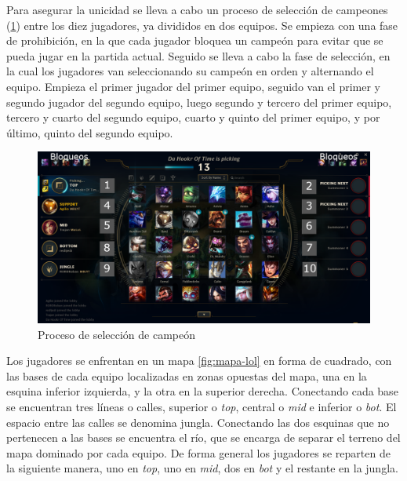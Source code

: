 Para asegurar la unicidad se lleva a cabo un proceso de selección de campeones (\ref{fig:early-pick}) entre los diez jugadores, ya divididos en dos equipos. Se empieza con una fase de prohibición, en la que cada jugador bloquea un campeón para evitar que se pueda jugar en la partida actual. Seguido se lleva a cabo la fase de selección, en la cual los jugadores van seleccionando su campeón en orden y alternando el equipo. Empieza el primer jugador del primer equipo, seguido van el primer y segundo jugador del segundo equipo, luego segundo y tercero del primer equipo, tercero y cuarto del segundo equipo, cuarto y quinto del primer equipo, y por último, quinto del segundo equipo.

\begin{figure}[h]
	\centering
	\includegraphics[width=1\linewidth]{img/early-pick}
	\caption{Proceso de selección de campeón}
	\label{fig:early-pick}
\end{figure}


Los jugadores se enfrentan en un mapa \ref{fig:mapa-lol} en forma de cuadrado, con las bases de cada equipo localizadas en zonas opuestas del mapa, una en la esquina inferior izquierda, y la otra en la superior derecha. Conectando cada base se encuentran tres líneas o calles, superior o \textit{top}, central o \textit{mid} e inferior o \textit{bot}. El espacio entre las calles se denomina jungla. Conectando las dos esquinas que no pertenecen a las bases se encuentra el río, que se encarga de separar el terreno del mapa dominado por cada equipo. De forma general los jugadores se reparten de la siguiente manera, uno en \textit{top}, uno en \textit{mid}, dos en \textit{bot} y el restante en la jungla.

